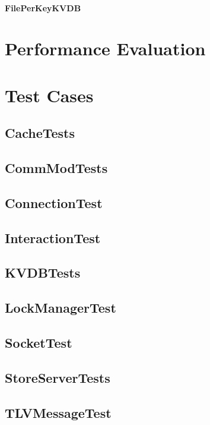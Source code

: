 \documentclass[12pt]{article}
\begin{document}
\begin{multicols}{2}
\paragraph{FilePerKeyKVDB}


\section{Performance Evaluation}


\section{Test Cases}

\subsection{CacheTests}

\subsection{CommModTests}

\subsection{ConnectionTest}

\subsection{InteractionTest}

\subsection{KVDBTests}

\subsection{LockManagerTest}

\subsection{SocketTest}

\subsection{StoreServerTests}

\subsection{TLVMessageTest}

\end{multicols}
\end{document}

